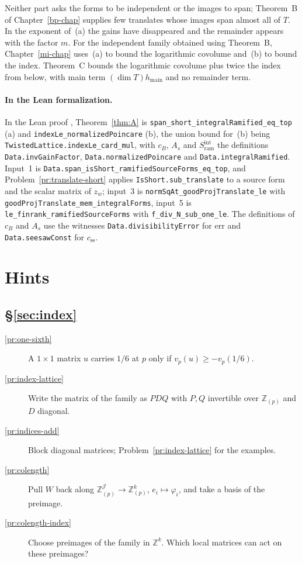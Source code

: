 \documentclass[reqno]{amsart}
\newcounter{chap}
\theoremstyle{definition}
\theoremstyle{plain}
\theoremstyle{definition}
\newcommand{\Z}{\mathbb{Z}}
\newcommand{\Zp}{\Z_{(p)}}
\newcommand{\err}{\mathrm{err}}
\newcommand{\hm}{h_{\mathrm{main}}}
\newcommand{\Sram}{S_{\mathrm{ram}}}
\begin{document}
Neither part asks the forms to be independent or the images to span; Theorem~B of Chapter~\ref{bp-chap} supplies few translates whose images span almost all of \(T\).  In the exponent of~(a) the gains have disappeared and the remainder appears with the factor \(m\).  For the independent family obtained using Theorem~B, Chapter~\ref{mi-chap} uses~(a) to bound the logarithmic covolume and~(b) to bound the index.  Theorem~C bounds the logarithmic covolume plus twice the index from below, with main term \((\dim T)\hm\) and no remainder term.

\paragraph{In the Lean formalization.}
In the Lean proof \cite{GL}, Theorem~\ref{thm:A} is \texttt{span\_short\_integralRamified\_eq\_top} (a) and \texttt{indexLe\_normalizedPoincare} (b), the union bound for~(b) being \texttt{TwistedLattice.indexLe\_card\_mul}, with \(c_B\), \(A_s\) and \(\Sram^{\mathrm{int}}\) the definitions \texttt{Data.invGainFactor}, \texttt{Data.normalizedPoincare} and \texttt{Data.integralRamified}.  Input~1 is \texttt{Data.span\_isShort\_ramifiedSourceForms\_eq\_top}, and Problem~\ref{pr:translate-short} applies \texttt{IsShort.sub\_translate} to a source form and the scalar matrix of \(z_w\); input~3 is \texttt{normSqAt\_goodProjTranslate\_le} with \texttt{goodProjTranslate\_mem\_integralForms}, input~5 is \texttt{le\_finrank\_ramifiedSourceForms} with \texttt{f\_div\_N\_sub\_one\_le}.  The definitions of \(c_B\) and \(A_s\) use the witnesses \texttt{Data.divisibilityError} for \(\err\) and \texttt{Data.seesawConst} for \(c_{\mathrm{ss}}\).

\section*{Hints}

\subsection*{\S\ref{sec:index}}
\begin{description}
\item[\ref{pr:one-sixth}] A \(1 \times 1\) matrix \(u\) carries \(1/6\) at \(p\) only if \(v_p(u) \ge -v_p(1/6)\).
\item[\ref{pr:index-lattice}] Write the matrix of the family as \(PDQ\) with \(P, Q\) invertible over \(\Zp\) and \(D\) diagonal.
\item[\ref{pr:indices-add}] Block diagonal matrices; Problem~\ref{pr:index-lattice} for the examples.
\item[\ref{pr:colength}] Pull \(W\) back along \(\Zp^{\mathcal{J}} \to \Zp^k\), \(e_i \mapsto \varphi_i\), and take a basis of the preimage.
\item[\ref{pr:colength-index}] Choose preimages of the family in \(\Z^k\).  Which local matrices can act on these preimages?
\end{description}
\end{document}
